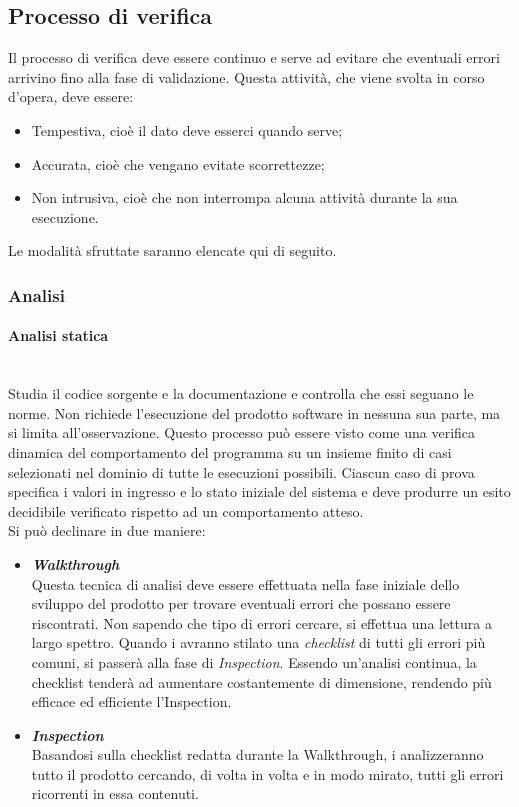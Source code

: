 \subsection{Processo di verifica}
Il processo di verifica deve essere continuo e serve ad evitare che eventuali errori arrivino fino alla fase di validazione.
Questa attività, che viene svolta in corso d'opera, deve essere:
\begin{itemize}
	\item Tempestiva, cioè il dato deve esserci quando serve;
	\item Accurata, cioè che vengano evitate scorrettezze;
	\item Non intrusiva, cioè che non interrompa alcuna attività durante la sua esecuzione.
\end{itemize}
Le modalità sfruttate saranno elencate qui di seguito.
	\subsubsection{Analisi}
	\paragraph{Analisi statica}
	~\\Studia il codice sorgente e la documentazione e controlla che essi seguano le norme. Non richiede l'esecuzione del prodotto software in nessuna sua parte, ma si limita all'osservazione. Questo processo può essere visto come una verifica dinamica del comportamento del programma su un insieme finito di casi selezionati nel dominio di tutte le esecuzioni possibili. Ciascun caso di prova specifica i valori in ingresso e lo stato iniziale del sistema e deve produrre un esito decidibile verificato rispetto ad un comportamento atteso. 
	\\Si può declinare in due maniere:
	\begin{itemize}
		\item \emph{\textbf{\emph{Walkthrough}}}
		~\\Questa tecnica di analisi deve essere effettuata nella fase iniziale dello sviluppo del prodotto per trovare eventuali errori che possano essere riscontrati. Non sapendo che tipo di errori cercare, si effettua una lettura a largo spettro. Quando i \vers{} avranno stilato una \emph{checklist} di tutti gli errori più comuni, si passerà alla fase di \emph{Inspection}. Essendo un'analisi continua, la checklist tenderà ad aumentare costantemente di dimensione, rendendo più efficace ed efficiente l'Inspection.
		\item \emph{\textbf{Inspection}}
		~\\Basandosi sulla checklist redatta durante la Walkthrough, i \vers{} analizzeranno tutto il prodotto cercando, di volta in volta e in modo mirato, tutti gli errori ricorrenti in essa contenuti.
	\end{itemize}

